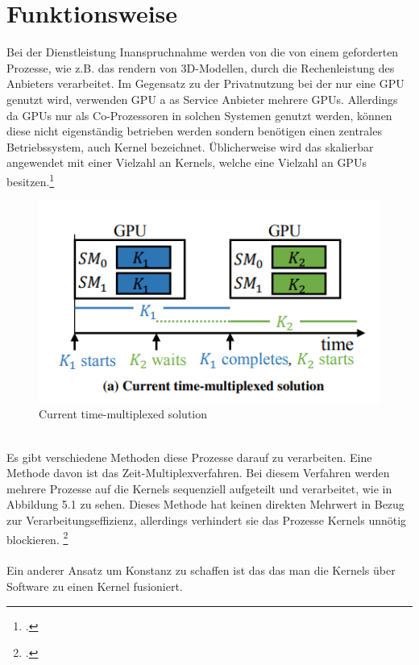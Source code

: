 \documentclass[12pt,toc=bib,toc=listof]{scrreprt}
\begin{document}
\section{Funktionsweise}
\label{sec: Funktionsweise}

Bei der Dienstleistung Inanspruchnahme werden von die von einem geforderten
Prozesse, wie z.B. das rendern von 3D-Modellen, durch die Rechenleistung des 
Anbieters verarbeitet. Im Gegensatz zu der Privatnutzung bei der nur eine GPU genutzt wird, 
verwenden GPU a as Service Anbieter mehrere GPUs. 
Allerdings da GPUs nur als Co-Prozessoren in solchen Systemen genutzt werden, 
können diese nicht eigenständig betrieben werden sondern benötigen einen zentrales 
Betriebssystem, auch Kernel bezeichnet. Üblicherweise wird das skalierbar angewendet mit einer
Vielzahl an Kernels, welche eine Vielzahl an GPUs besitzen.\footcite [Vgl.] [] {Wang.2017}
\\%
\begin{figure}[h]
 \centering
  \includegraphics[scale=1.4]{Abbildungen/wang1.png} 
  \caption[Wang u. a. (2017)]{Current time-multiplexed solution}
\end{figure}
\\%
Es gibt verschiedene Methoden diese Prozesse darauf zu verarbeiten. Eine Methode davon 
ist das Zeit-Multiplexverfahren. Bei diesem Verfahren werden mehrere Prozesse auf die Kernels
sequenziell aufgeteilt und verarbeitet, wie in Abbildung 5.1 zu sehen. Dieses Methode 
hat keinen direkten Mehrwert in Bezug zur Verarbeitungseffizienz, allerdings verhindert 
sie das Prozesse Kernels unnötig blockieren. \footcite [Vgl.] [] {Wang.2017}
\\ \\
Ein anderer Ansatz um Konstanz zu schaffen ist das das man die Kernels über Software zu einen Kernel fusioniert. 
\end{document}
